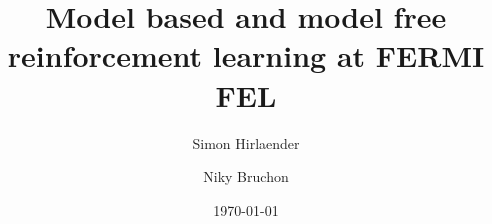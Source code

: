 \documentclass[
 reprint,
 amsmath,amssymb,amsfonts,clevref,
 aps,
prstab,
]{revtex4-2}
\begin{document}



\title{Model based and model free reinforcement learning at FERMI FEL}



\author{Simon Hirlaender}
\author{Niky Bruchon}%

\date{\today}%
\end{document}
